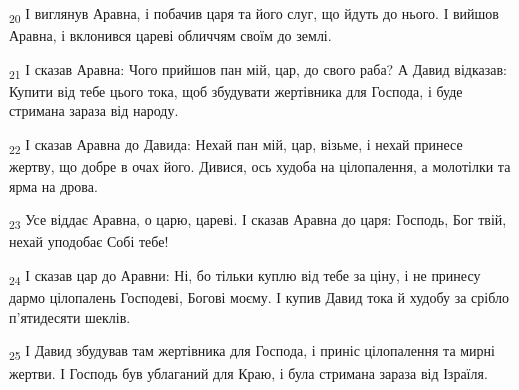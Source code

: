 \begin{tcolorbox}
\textsubscript{20} І виглянув Аравна, і побачив царя та його слуг, що йдуть до нього. І вийшов Аравна, і вклонився цареві обличчям своїм до землі.
\end{tcolorbox}
\begin{tcolorbox}
\textsubscript{21} І сказав Аравна: Чого прийшов пан мій, цар, до свого раба? А Давид відказав: Купити від тебе цього тока, щоб збудувати жертівника для Господа, і буде стримана зараза від народу.
\end{tcolorbox}
\begin{tcolorbox}
\textsubscript{22} І сказав Аравна до Давида: Нехай пан мій, цар, візьме, і нехай принесе жертву, що добре в очах його. Дивися, ось худоба на цілопалення, а молотілки та ярма на дрова.
\end{tcolorbox}
\begin{tcolorbox}
\textsubscript{23} Усе віддає Аравна, о царю, цареві. І сказав Аравна до царя: Господь, Бог твій, нехай уподобає Собі тебе!
\end{tcolorbox}
\begin{tcolorbox}
\textsubscript{24} І сказав цар до Аравни: Ні, бо тільки куплю від тебе за ціну, і не принесу дармо цілопалень Господеві, Богові моєму. І купив Давид тока й худобу за срібло п'ятидесяти шеклів.
\end{tcolorbox}
\begin{tcolorbox}
\textsubscript{25} І Давид збудував там жертівника для Господа, і приніс цілопалення та мирні жертви. І Господь був ублаганий для Краю, і була стримана зараза від Ізраїля.
\end{tcolorbox}
